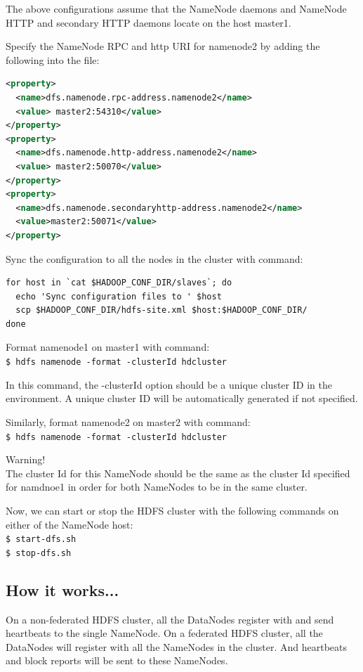 The above configurations assume that the NameNode daemons and NameNode HTTP and secondary HTTP daemons locate on the host master1.

Specify the NameNode RPC and http URI for namenode2 by adding the following into the file:
\lstset{style=bashstyle}
\begin{lstlisting}[language=XML]
<property>
  <name>dfs.namenode.rpc-address.namenode2</name>
  <value> master2:54310</value>
</property>
<property>
  <name>dfs.namenode.http-address.namenode2</name>
  <value> master2:50070</value>
</property>
<property>
  <name>dfs.namenode.secondaryhttp-address.namenode2</name>
  <value>master2:50071</value>
</property>
\end{lstlisting}

Sync the configuration to all the nodes in the cluster with command:
\begin{verbatim}
for host in `cat $HADOOP_CONF_DIR/slaves`; do
  echo 'Sync configuration files to ' $host
  scp $HADOOP_CONF_DIR/hdfs-site.xml $host:$HADOOP_CONF_DIR/
done
\end{verbatim}

Format namenode1 on master1 with command: \\
\verb|$ hdfs namenode -format -clusterId hdcluster|

In this command, the -clusterId option should be a unique cluster ID in the environment. A unique cluster ID will be automatically generated if not specified.

Similarly, format namenode2 on master2 with command: \\
\verb|$ hdfs namenode -format -clusterId hdcluster|
\begin{warning}
Warning! \\
The cluster Id for this NameNode should be the same as the cluster Id specified for namdnoe1 in order for both NameNodes to be in the same cluster.
\end{warning}

Now, we can start or stop the HDFS cluster with the following commands on either of the NameNode host:\\
\verb|$ start-dfs.sh| \\
\verb|$ stop-dfs.sh|

\subsection*{How it works...}
On a non-federated HDFS cluster, all the DataNodes register with and send heartbeats to the single NameNode. On a federated HDFS cluster, all the DataNodes will register with all the NameNodes in the cluster. And heartbeats and block reports will be sent to these NameNodes.

